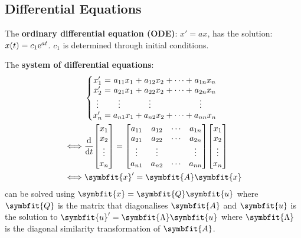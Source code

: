 \documentclass{article}
\begin{document}
\begin{multicols*}{2}

    \section*{Differential Equations}
    The \textbf{ordinary differential equation (ODE)}: $x' = a x$,
    has the solution: $x(t) = c_1 \mathrm{e}^{a t}$. $c_1$ is determined through
    initial conditions.

    The \textbf{system of differential equations}:
    \begin{align*}
               & \left\{
        \setlength\arraycolsep{0pt}
        \begin{array}{ c >{{}}c<{{}} c >{{}}c<{{}} c >{{}}c<{{}} c >{{}}c<{{}} c  }
            x'_1               & = & a_{11}x_1                         & + & a_{12}x_2                         & + & \cdots & + & a_{1n}x_n                         \\
            x'_2               & = & a_{21}x_1                         & + & a_{22}x_2                         & + & \cdots & + & a_{2n}x_n                         \\
            \vdotswithin{x'_3} &   & \vdotswithin{a_{31}}\phantom{x_1} &   & \vdotswithin{a_{32}}\phantom{x_2} &   &        &   & \vdotswithin{a_{3n}}\phantom{x_n} \\
            x'_n               & = & a_{n1}x_1                         & + & a_{n2}x_2                         & + & \cdots & + & a_{nn}x_n
        \end{array}
        \right.                                                           \\
        \iff
               & \dv{t}\mqty[x_1                                          \\ x_2 \\ \vdots \\ x_n] = \mqty[
        a_{11} & a_{12}                                 & \cdots & a_{1n} \\
        a_{21} & a_{22}                                 & \cdots & a_{2n} \\
        \vdots & \vdots                                 &        & \vdots \\
        a_{n1} & a_{n2}                                 & \cdots & a_{nn}
        ] \mqty[x_1                                                       \\ x_2 \\ \vdots \\ x_n] \\
        \iff   & \symbfit{x}' = \symbfit{A} \symbfit{x}
    \end{align*}
    can be solved using $\symbfit{x}=\symbfit{Q}\symbfit{u}$ where
    $\symbfit{Q}$ is the matrix that diagonalises $\symbfit{A}$ and
    $\symbfit{u}$ is the solution to $\symbfit{u}' = \symbfit{\Lambda} \symbfit{u}$ where
    $\symbfit{\Lambda}$ is the diagonal similarity transformation of $\symbfit{A}$.


\end{multicols*}
\end{document}
